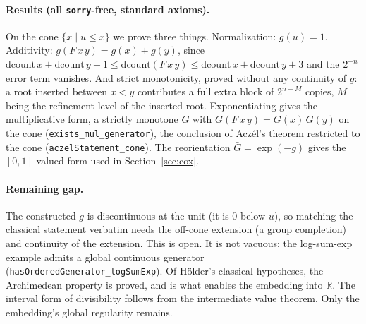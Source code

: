 \paragraph{Results (all \texttt{sorry}-free, standard axioms).}
On the cone $\{x \mid u \le x\}$ we prove three things.
Normalization: $g(u) = 1$.  Additivity:
$g(F\,x\,y) = g(x) + g(y)$, since
$\mathrm{dcount}\,x + \mathrm{dcount}\,y + 1 \le
\mathrm{dcount}(F\,x\,y) \le \mathrm{dcount}\,x +
\mathrm{dcount}\,y + 3$ and the $2^{-n}$ error term vanishes.  And
strict monotonicity, proved without any continuity of $g$: a root
inserted between $x < y$ contributes a full extra block of
$2^{n-M}$ copies, $M$ being the refinement level of the inserted
root.  Exponentiating gives the multiplicative form, a strictly
monotone $G$ with $G(F\,x\,y) = G(x)\,G(y)$ on the cone
(\texttt{exists\_mul\_generator}), the conclusion of Acz\'el's
theorem restricted to the cone
(\texttt{aczelStatement\_cone}).  The reorientation
$\bar G = \exp(-g)$ gives the $[0,1]$-valued form used in
Section~\ref{sec:cox}.

\paragraph{Remaining gap.}
The constructed $g$ is discontinuous at the unit (it is $0$ below
$u$), so matching the classical statement verbatim needs the
off-cone extension (a group completion) and continuity of the
extension.  This is open.  It is not vacuous: the log-sum-exp
example admits a global continuous generator
(\texttt{hasOrderedGenerator\_\allowbreak logSumExp}).  Of H\"older's
classical hypotheses, the Archimedean property is proved, 
and is what enables the embedding into $\mathbb{R}$.
The interval form of divisibility follows from the intermediate
value theorem.  Only the embedding's global regularity remains.
